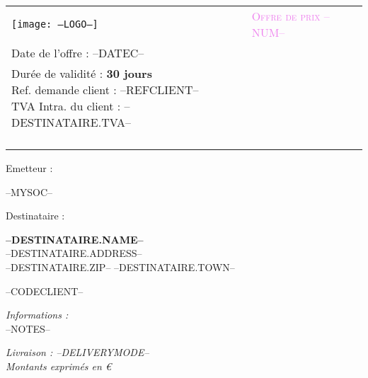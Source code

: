 \newcommand{\FOOT}{--FOOT--}

\newcommand{\specialcell}[2][c]{
	\parbox[#1]{5.8cm}{#2}}
	
\begin{tabular}{p{9cm} p{8cm}}
    \vspace{0pt} 
    \texttt{[image: --LOGO--]}
    & 
    \vspace{0pt}
   \raggedleft
	\textcolor{violet}{\textsc{\Large Offre de prix --NUM--}}\\
	Date de l'offre : --DATEC--\\
	{\small Dur\'ee de validité : \textbf{30 jours}\\
	Ref. demande client : --REFCLIENT--\\
	TVA Intra. du  client : --DESTINATAIRE.TVA--\\}~\\
\end{tabular}

\vspace{-0.7cm}

\begin{minipage}[t]{0.40\textwidth}
{\small Emetteur :}\\
\begin{fminipage}
--MYSOC--
\end{fminipage}
\end{minipage}
\hspace{1cm}
\begin{minipage}[t]{0.52\textwidth}
{\small Destinataire :}

\begin{fminipage}
\textbf{\large --DESTINATAIRE.NAME--}\\
--DESTINATAIRE.ADDRESS--\\
\textsc{--DESTINATAIRE.ZIP-- --DESTINATAIRE.TOWN--}\\
\begin{minipage}{\textwidth}
\flushright
{\tiny --CODECLIENT--}
\end{minipage}
\end{fminipage}
\end{minipage}

\begin{minipage}[t]{0.60\textwidth}
{\small \it Informations :}\\
--NOTES-- \\
\end{minipage}
\hspace{1cm}
\begin{minipage}[t]{0.32\textwidth}
\begin{flushright}
{\it Livraison : {--DELIVERYMODE--}}\\
\vspace{1em}
{\footnotesize \textit{Montants exprimés en €}}
\end{flushright}
\end{minipage}

